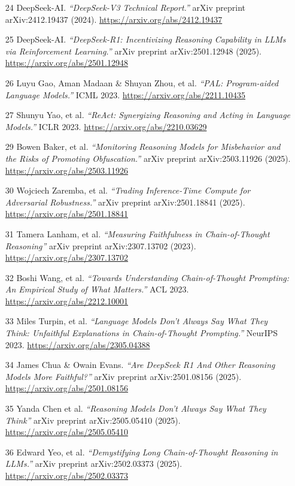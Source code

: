 \documentclass[12pt]{article}
\begin{document}
\begin{itemize}
    \item [24] DeepSeek-AI. \textit{``DeepSeek-V3 Technical Report.''} arXiv preprint arXiv:2412.19437 (2024). \url{https://arxiv.org/abs/2412.19437}
    \item [25] DeepSeek-AI. \textit{``DeepSeek-R1: Incentivizing Reasoning Capability in LLMs via Reinforcement Learning.''} arXiv preprint arXiv:2501.12948 (2025). \url{https://arxiv.org/abs/2501.12948}
    \item [26] Luyu Gao, Aman Madaan \& Shuyan Zhou, et al. \textit{``PAL: Program-aided Language Models.''} ICML 2023. \url{https://arxiv.org/abs/2211.10435}
    \item [27] Shunyu Yao, et al. \textit{``ReAct: Synergizing Reasoning and Acting in Language Models.''} ICLR 2023. \url{https://arxiv.org/abs/2210.03629}
    \item [29] Bowen Baker, et al. \textit{``Monitoring Reasoning Models for Misbehavior and the Risks of Promoting Obfuscation.''} arXiv preprint arXiv:2503.11926 (2025). \url{https://arxiv.org/abs/2503.11926}
    \item [30] Wojciech Zaremba, et al. \textit{``Trading Inference-Time Compute for Adversarial Robustness.''} arXiv preprint arXiv:2501.18841 (2025). \url{https://arxiv.org/abs/2501.18841}
    \item [31] Tamera Lanham, et al. \textit{``Measuring Faithfulness in Chain-of-Thought Reasoning''} arXiv preprint arXiv:2307.13702 (2023). \url{https://arxiv.org/abs/2307.13702}
    \item [32] Boshi Wang, et al. \textit{``Towards Understanding Chain-of-Thought Prompting: An Empirical Study of What Matters.''} ACL 2023. \url{https://arxiv.org/abs/2212.10001}
    \item [33] Miles Turpin, et al. \textit{``Language Models Don’t Always Say What They Think: Unfaithful Explanations in Chain-of-Thought Prompting.''} NeurIPS 2023. \url{https://arxiv.org/abs/2305.04388}
    \item [34] James Chua \& Owain Evans. \textit{``Are DeepSeek R1 And Other Reasoning Models More Faithful?''} arXiv preprint arXiv:2501.08156 (2025). \url{https://arxiv.org/abs/2501.08156}
    \item [35] Yanda Chen et al. \textit{``Reasoning Models Don’t Always Say What They Think''} arXiv preprint arXiv:2505.05410 (2025). \url{https://arxiv.org/abs/2505.05410}
    \item [36] Edward Yeo, et al. \textit{``Demystifying Long Chain-of-Thought Reasoning in LLMs.''} arXiv preprint arXiv:2502.03373 (2025). \url{https://arxiv.org/abs/2502.03373}

\end{itemize}
\end{document}
